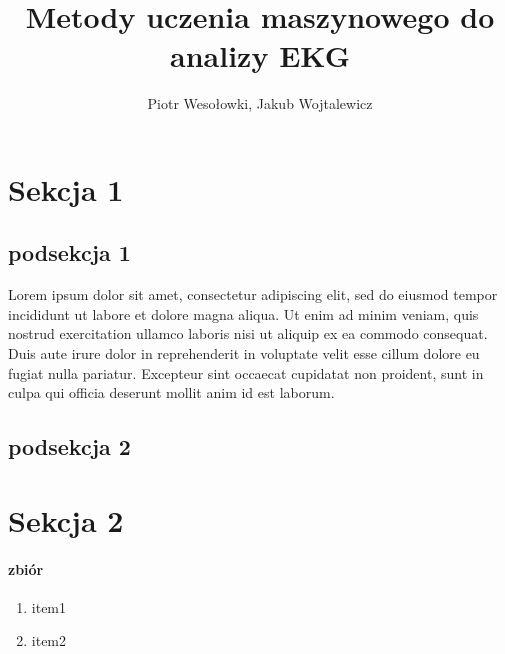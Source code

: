 \documentclass[12pt]{article}
\title{Metody uczenia maszynowego do analizy EKG}
\author{Piotr Wesołowki, Jakub Wojtalewicz}
\begin{document}
    \maketitle

    \section{Sekcja 1}
        \subsection*{podsekcja 1}
        Lorem ipsum dolor sit amet, consectetur adipiscing elit, sed do eiusmod tempor incididunt ut labore et dolore magna aliqua. Ut enim ad minim veniam, quis nostrud exercitation ullamco laboris nisi ut aliquip ex ea commodo consequat. Duis aute irure dolor in reprehenderit in voluptate velit esse cillum dolore eu fugiat nulla pariatur. Excepteur sint occaecat cupidatat non proident, sunt in culpa qui officia deserunt mollit anim id est laborum.
        \subsection*{podsekcja 2}
    \section{Sekcja 2}
        \paragraph*{zbiór}
            \begin{enumerate}
                \item item1
                \item item2
            \end{enumerate}
        
\end{document}
